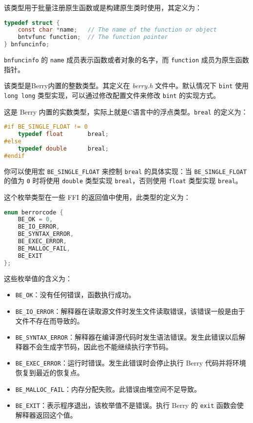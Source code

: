 
该类型用于批量注册原生函数或是构建原生类时使用，其定义为：
\begin{lstlisting}[language=c, style=berry, numbers=none]
typedef struct {
    const char *name;   // The name of the function or object
    bntvfunc function;  // The function pointer
} bnfuncinfo;
\end{lstlisting}
\texttt{bnfuncinfo} 的 \texttt{name} 成员表示函数或者对象的名字，而 \texttt{function} 成员为原生函数指针。


该类型是Berry内置的整数类型。其定义在 \textsl{berry.h} 文件中。默认情况下 \texttt{bint} 使用 \texttt{long long} 类型实现，可以通过修改配置文件来修改 \texttt{bint} 的实现方式。


这是 Berry 内置的实数类型，实际上就是C语言中的浮点类型。\texttt{breal} 的定义为：
\begin{lstlisting}[language=c, style=berry, numbers=none]
#if BE_SINGLE_FLOAT != 0
    typedef float       breal;
#else
    typedef double      breal;
#endif
\end{lstlisting}
你可以使用宏 \texttt{BE\_SINGLE\_FLOAT} 来控制 \texttt{breal} 的具体实现：当 \texttt{BE\_SINGLE\_FLOAT} 的值为 \texttt{0} 时将使用 \texttt{double} 类型实现 \texttt{breal}，否则使用 \texttt{float} 类型实现 \texttt{breal}。

 \label{section::errorcode}

这个枚举类型在一些 FFI 的返回值中使用，此类型的定义为：
\begin{lstlisting}[language=c, style=berry, numbers=none]
enum berrorcode {
    BE_OK = 0,
    BE_IO_ERROR,
    BE_SYNTAX_ERROR,
    BE_EXEC_ERROR,
    BE_MALLOC_FAIL,
    BE_EXIT
};
\end{lstlisting}
这些枚举值的含义为：
\begin{itemize}
    \item \texttt{BE\_OK}：没有任何错误，函数执行成功。
    \item \texttt{BE\_IO\_ERROR}：解释器在读取源文件时发生文件读取错误，该错误一般是由于文件不存在而导致的。
    \item \texttt{BE\_SYNTAX\_ERROR}：解释器在编译源代码时发生语法错误。发生此错误以后解释器不会生成字节码，因此也不能继续执行字节码。
    \item \texttt{BE\_EXEC\_ERROR}：运行时错误。发生此错误时会停止执行 Berry 代码并将环境恢复到最近的恢复点。
    \item \texttt{BE\_MALLOC\_FAIL}：内存分配失败。此错误由堆空间不足导致。
    \item \texttt{BE\_EXIT}：表示程序退出，该枚举值不是错误。执行 Berry 的 \texttt{exit} 函数会使解释器返回这个值。
\end{itemize}

